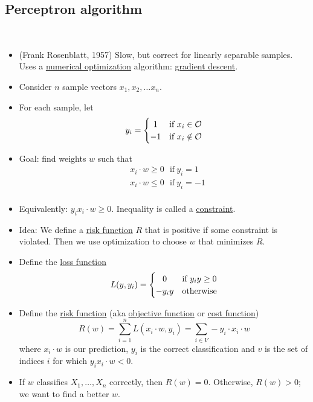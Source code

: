 \documentclass[10pt]{article}
\begin{document}
	\subsection{Perceptron algorithm}
		\
		\begin{itemize}
			\item (Frank Rosenblatt, 1957) Slow, but correct for linearly separable samples. Uses a \underline{numerical optimization} algorithm: \underline{gradient descent}.
			
			\item Consider $n$ sample vectors $x_{1}, x_{2}, \dots x_{n}$.
			
			\item For each sample, let
				\[
 					y_{i} = \left\{\def\arraystretch{1.2}%
 						\begin{array}{@{}c@{\quad}l@{}}
    						1 & \text{if $x_{i} \in \mathcal{O}$}\\
    						-1 & \text{if $x_{i} \notin \mathcal{O}$}\\
  						\end{array}\right.
				\]
			
			\item Goal: find weights $w$ such that
				\begin{align*}
					& x_{i} \cdot w \geq 0 \ \ \ \text{if} \ y_{i} = 1 \\
					& x_{i} \cdot w \leq 0 \ \ \ \text{if} \ y_{i} = -1\\
				\end{align*}
			 
			 \item Equivalently: $y_{i}x_{i} \cdot w \geq 0$. Inequality is called a \underline{constraint}.
			 
			 \item Idea: We define a \underline{risk function} $R$ that is positive if some constraint is violated. Then we use optimization to choose $w$ that minimizes $R$.
			 
			 \item Define the \underline{loss function}
			 	\[
 					L(y, y_{i}) = \left\{\def\arraystretch{1.2}%
 						\begin{array}{@{}c@{\quad}l@{}}
    						0 & \text{if $y_{i}y \geq 0 $}\\
    						-y_{i}y & \text{otherwise}\\
  						\end{array}\right.
				\]
			
			\item Define the \underline{risk function} (aka \underline{objective function} or \underline{cost function})
				$$ R(w) = \sum_{i=1}^{n} L(x_{i} \cdot w, y_{i}) = 
					\sum_{i \in V} -y_{i} \cdot x_{i} \cdot w $$
				where $x_{i} \cdot w$ is our prediction, $y_{i}$ is the correct classification and $v$ is the set of indices $i$ for which $y_{i}x_{i} \cdot w < 0$.
			\item If $w$ classifies $X_{1}, \dots, X_{n}$ correctly, then $R(w) = 0$. Otherwise, $R(w) > 0$; we want to find a better $w$.
			

\end{itemize}
\end{document}
